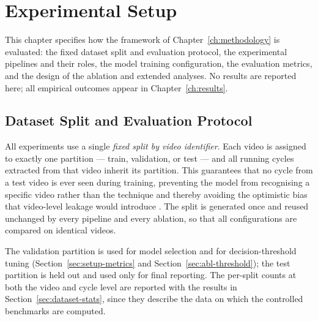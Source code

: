 %
%

\chapter{Experimental Setup}
\label{ch:experimental-setup}

This chapter specifies how the framework of Chapter~\ref{ch:methodology} is
evaluated: the fixed dataset split and evaluation protocol, the experimental
pipelines and their roles, the model training configuration, the evaluation
metrics, and the design of the ablation and extended analyses. No results are
reported here; all empirical outcomes appear in Chapter~\ref{ch:results}.

\section{Dataset Split and Evaluation Protocol}
\label{sec:setup-split}

All experiments use a single \emph{fixed split by video identifier}. Each video
is assigned to exactly one partition --- train, validation, or test --- and all
running cycles extracted from that video inherit its partition. This guarantees
that no cycle from a test video is ever seen during training, preventing the
model from recognising a specific video rather than the technique and thereby
avoiding the optimistic bias that video-level leakage would introduce
. The split is generated once and reused unchanged by every
pipeline and every ablation, so that all configurations are compared on
identical videos.

The validation partition is used for model selection and for decision-threshold
tuning (Section~\ref{sec:setup-metrics} and
Section~\ref{sec:abl-threshold}); the test partition is held out and used only
for final reporting. The per-split counts at both the video and cycle level are
reported with the results in Section~\ref{sec:dataset-stats}, since they
describe the data on which the controlled benchmarks are computed.

